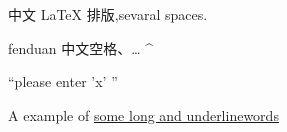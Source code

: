 \documentclass[12pt,a4paper]{ctexart}
\begin{document}
    中文 \LaTeX{} 排版,sevaral spaces.\par
    fenduan
    中文\quad 空格、\ldots
    \^{} \par
    ``please enter 'x' ''\par
    A example of \uline {some long and underlinewords}
    

    
\end{document}
